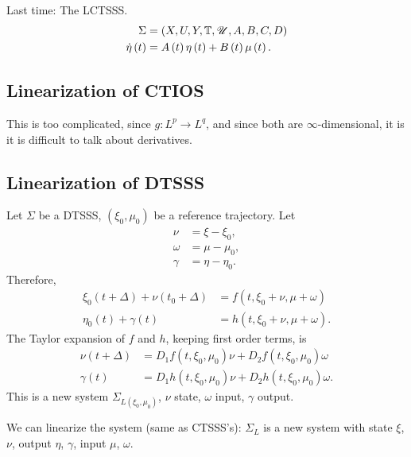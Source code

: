 
Last time: The LCTSSS. 
\begin{align*}
	\Sigma &= \left( X, U, Y, \mathbb{T} , \mathscr{U}, A, B , C, D \right) \\
		\dot{\eta}\left( t \right) &=  A\left( t \right) \eta\left( t \right)  + B\left( t \right) \mu\left( t \right)  
.\end{align*}

\subsection{Linearization of CTIOS}

This is too complicated, since $g : L^{p} \to L^{q}$, and since both are $\infty$-dimensional, it is it is difficult to talk about derivatives. 

\subsection{Linearization of DTSSS}

Let $\Sigma$ be a DTSSS, $\left( \xi_0, \mu_0 \right) $ be a reference trajectory. Let 
\begin{align*}
	\nu &= \xi  - \xi_0,\\
	\omega &= \mu - \mu_0, \\
	\gamma &= \eta - \eta_0 
.\end{align*}
Therefore, 
\begin{align*}
	\xi_0 \left( t + \Delta	 \right)  + \nu \left( t_0 + \Delta \right) &= f\left( t , \xi_0 + \nu, \mu + \omega \right)  \\
	\eta_0\left( t \right)  + \gamma \left( t \right) &= h\left( t, \xi_0 + \nu , \mu + \omega \right)  
.\end{align*}
The Taylor expansion of $f$ and $h $, keeping first order terms, is 
\begin{align*}
	\nu\left( t + \Delta \right) &= D_1 f\left( t, \xi_0, \mu_0 \right) \nu + D_2 f\left( t, \xi_0 ,\mu_0 \right) \omega \\
	\gamma\left( t  \right) &= D_1 h\left( t, \xi_0, \mu_0 \right) \nu + D_2 h\left( t, \xi_0, \mu_0 \right) \omega 
.\end{align*}
This is a new system $\Sigma_{L\left( \xi_0, \mu_0 \right) }$, $\nu$ state, $\omega$ input, $\gamma$ output.

We can linearize the system (same as CTSSS's): $\Sigma_L$ is a new system with state $\xi$, $\nu$, output $\eta$, $\gamma$, input $\mu$, $\omega$.
